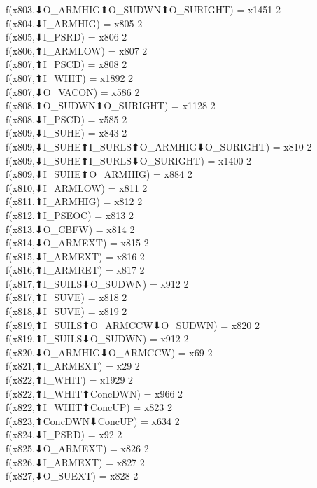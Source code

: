 f(x803,⬇O_ARMHIG⬆O_SUDWN⬆O_SURIGHT) = x1451 {2} \\
f(x804,⬇I_ARMHIG) = x805 {2} \\
f(x805,⬇I_PSRD) = x806 {2} \\
f(x806,⬆I_ARMLOW) = x807 {2} \\
f(x807,⬆I_PSCD) = x808 {2} \\
f(x807,⬆I_WHIT) = x1892 {2} \\
f(x807,⬇O_VACON) = x586 {2} \\
f(x808,⬆O_SUDWN⬆O_SURIGHT) = x1128 {2} \\
f(x808,⬇I_PSCD) = x585 {2} \\
f(x809,⬇I_SUHE) = x843 {2} \\
f(x809,⬇I_SUHE⬆I_SURLS⬆O_ARMHIG⬇O_SURIGHT) = x810 {2} \\
f(x809,⬇I_SUHE⬆I_SURLS⬇O_SURIGHT) = x1400 {2} \\
f(x809,⬇I_SUHE⬆O_ARMHIG) = x884 {2} \\
f(x810,⬇I_ARMLOW) = x811 {2} \\
f(x811,⬆I_ARMHIG) = x812 {2} \\
f(x812,⬆I_PSEOC) = x813 {2} \\
f(x813,⬇O_CBFW) = x814 {2} \\
f(x814,⬇O_ARMEXT) = x815 {2} \\
f(x815,⬇I_ARMEXT) = x816 {2} \\
f(x816,⬆I_ARMRET) = x817 {2} \\
f(x817,⬆I_SUILS⬇O_SUDWN) = x912 {2} \\
f(x817,⬆I_SUVE) = x818 {2} \\
f(x818,⬇I_SUVE) = x819 {2} \\
f(x819,⬆I_SUILS⬆O_ARMCCW⬇O_SUDWN) = x820 {2} \\
f(x819,⬆I_SUILS⬇O_SUDWN) = x912 {2} \\
f(x820,⬇O_ARMHIG⬇O_ARMCCW) = x69 {2} \\
f(x821,⬆I_ARMEXT) = x29 {2} \\
f(x822,⬆I_WHIT) = x1929 {2} \\
f(x822,⬆I_WHIT⬆ConcDWN) = x966 {2} \\
f(x822,⬆I_WHIT⬆ConcUP) = x823 {2} \\
f(x823,⬆ConcDWN⬇ConcUP) = x634 {2} \\
f(x824,⬇I_PSRD) = x92 {2} \\
f(x825,⬇O_ARMEXT) = x826 {2} \\
f(x826,⬇I_ARMEXT) = x827 {2} \\
f(x827,⬇O_SUEXT) = x828 {2} \\
